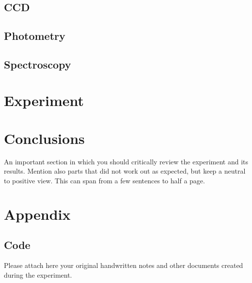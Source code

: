 \documentclass[12pt,a4paper]{article}
\begin{document}
  \subsection{CCD}
  \subsection{Photometry}
  \subsection{Spectroscopy}
\section{Experiment}

\section{Conclusions}
An important section in which you should critically review the experiment and its results. Mention also parts that did not work out as expected, but keep a neutral to positive view. This can span from a few sentences to half a page.

\setcounter{secnumdepth}{0}

\printbibliography
\appendix
\section{Appendix}
\subsection{Code}
\label{code}
Please attach here your original handwritten notes and other documents created during the experiment.
\end{document}
